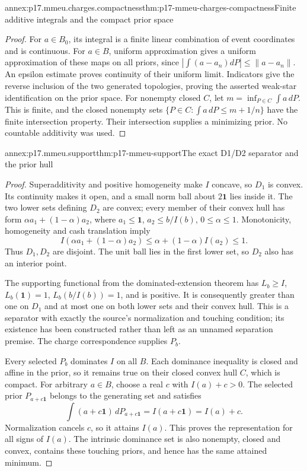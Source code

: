 \begin{annexitem}{annex:p17.mmeu.charges.compactness}{thm:p17-mmeu-charges-compactness}{Finite additive integrals and the compact prior space}
\begin{proof}
For \(a\in B_0\), its integral is
a finite linear combination of
event coordinates and is continuous.
For \(a\in B\), uniform approximation
gives a uniform approximation of
these maps on all priors, since
\(|\int(a-a_n)dP|\leq\|a-a_n\|\).
An epsilon estimate proves continuity
of their uniform limit.
Indicators give the reverse inclusion
of the two generated topologies,
proving the asserted weak-star
identification on the prior space.
For nonempty closed \(C\), let
\(m=\inf_{P\in C}\int a\,dP\).
This is finite, and the closed
nonempty sets
\(\{P\in C:\int a\,dP\leq m+1/n\}\)
have the finite intersection property.
Their intersection supplies a
minimizing prior. No countable
additivity was used.
\end{proof}
\end{annexitem}

\begin{annexitem}{annex:p17.mmeu.support}{thm:p17-mmeu-support}{The exact D1/D2 separator and the prior hull}
\begin{proof}
Superadditivity and positive homogeneity
make \(I\) concave, so \(D_1\) is
convex. Its continuity makes it open,
and a small norm ball about
\(2\mathbf1\) lies inside it.
The two lower sets defining \(D_2\)
are convex; every member of their
convex hull has form
\(\alpha a_1+(1-\alpha)a_2\),
where \(a_1\leq\mathbf1\),
\(a_2\leq b/I(b)\), \(0\leq\alpha\leq1\).
Monotonicity, homogeneity and cash
translation imply
\[
 I(\alpha a_1+(1-\alpha)a_2)
       \leq \alpha+(1-\alpha)I(a_2)\leq1.
\]
Thus \(D_1,D_2\) are disjoint.
The unit ball lies in the first
lower set, so \(D_2\) also has
an interior point.

The supporting functional from the
dominated-extension theorem has
\(L_b\geq I\), \(L_b(\mathbf1)=1\),
\(L_b(b/I(b))=1\), and is positive.
It is consequently greater than
one on \(D_1\) and at most one
on both lower sets and their
convex hull. This is a separator
with exactly the source's normalization
and touching condition; its existence
has been constructed rather than
left as an unnamed separation premise.
The charge correspondence supplies \(P_b\).

Every selected \(P_b\) dominates \(I\)
on all \(B\). Each dominance inequality
is closed and affine in the prior,
so it remains true on their closed
convex hull \(C\), which is compact.
For arbitrary \(a\in B\), choose
a real \(c\) with \(I(a)+c>0\).
The selected prior \(P_{a+c\mathbf1}\)
belongs to the generating set and
satisfies
\[
 \int(a+c\mathbf1)\,dP_{a+c\mathbf1}
                         =I(a+c\mathbf1)=I(a)+c.
\]
Normalization cancels \(c\), so it
attains \(I(a)\). This proves the
representation for all signs of \(I(a)\).
The intrinsic dominance set is also
nonempty, closed and convex, contains
these touching priors, and hence has
the same attained minimum.
\end{proof}
\end{annexitem}


